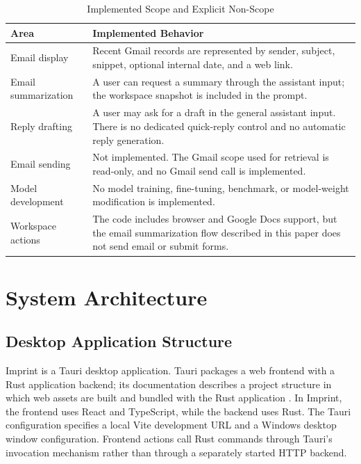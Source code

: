 \documentclass[conference]{IEEEtran}
\begin{document}
\begin{table}[t]
\caption{Implemented Scope and Explicit Non-Scope}
\label{tab:scope}
\centering
\footnotesize
\begin{tabularx}{\columnwidth}{@{}p{}Y@{}}
\toprule
\textbf{Area} & \textbf{Implemented Behavior} \\
\midrule
Email display & Recent Gmail records are represented by sender, subject, snippet, optional internal date, and a web link. \\
Email summarization & A user can request a summary through the assistant input; the workspace snapshot is included in the prompt. \\
Reply drafting & A user may ask for a draft in the general assistant input. There is no dedicated quick-reply control and no automatic reply generation. \\
Email sending & Not implemented. The Gmail scope used for retrieval is read-only, and no Gmail send call is implemented. \\
Model development & No model training, fine-tuning, benchmark, or model-weight modification is implemented. \\
Workspace actions & The code includes browser and Google Docs support, but the email summarization flow described in this paper does not send email or submit forms. \\
\bottomrule
\end{tabularx}
\end{table}

\section{System Architecture}

\subsection{Desktop Application Structure}

Imprint is a Tauri desktop application. Tauri packages a web frontend with a Rust application backend; its documentation describes a project structure in which web assets are built and bundled with the Rust application \cite{tauri_structure}. In Imprint, the frontend uses React and TypeScript, while the backend uses Rust. The Tauri configuration specifies a local Vite development URL and a Windows desktop window configuration. Frontend actions call Rust commands through Tauri's invocation mechanism rather than through a separately started HTTP backend.
\end{document}
